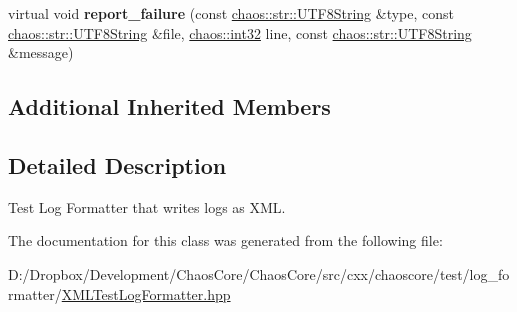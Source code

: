 \begin{DoxyCompactItemize}
\item 
\hypertarget{classchaos_1_1test_1_1log__formatter_1_1_x_m_l_test_log_formatter_ad27b65b89d70c313603ba305cab8f90e}{}virtual void {\bfseries report\+\_\+failure} (const \hyperlink{classchaos_1_1str_1_1_u_t_f8_string}{chaos\+::str\+::\+U\+T\+F8\+String} \&type, const \hyperlink{classchaos_1_1str_1_1_u_t_f8_string}{chaos\+::str\+::\+U\+T\+F8\+String} \&file, \hyperlink{namespacechaos_ad1de7efb430365afd2c9446a0f522a90}{chaos\+::int32} line, const \hyperlink{classchaos_1_1str_1_1_u_t_f8_string}{chaos\+::str\+::\+U\+T\+F8\+String} \&message)\label{classchaos_1_1test_1_1log__formatter_1_1_x_m_l_test_log_formatter_ad27b65b89d70c313603ba305cab8f90e}

\end{DoxyCompactItemize}
\subsection*{Additional Inherited Members}


\subsection{Detailed Description}
Test Log Formatter that writes logs as X\+M\+L. 

The documentation for this class was generated from the following file\+:\begin{DoxyCompactItemize}
\item 
D\+:/\+Dropbox/\+Development/\+Chaos\+Core/\+Chaos\+Core/src/cxx/chaoscore/test/log\+\_\+formatter/\hyperlink{_x_m_l_test_log_formatter_8hpp}{X\+M\+L\+Test\+Log\+Formatter.\+hpp}\end{DoxyCompactItemize}
